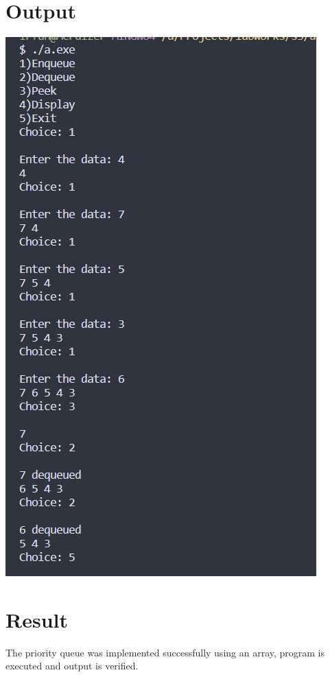 \section{Output}
\includegraphics[]{Cycle_1/Outputs/PriorityQueue.png}

\section{Result}
The priority queue was implemented successfully using an array, program is executed and output is verified.